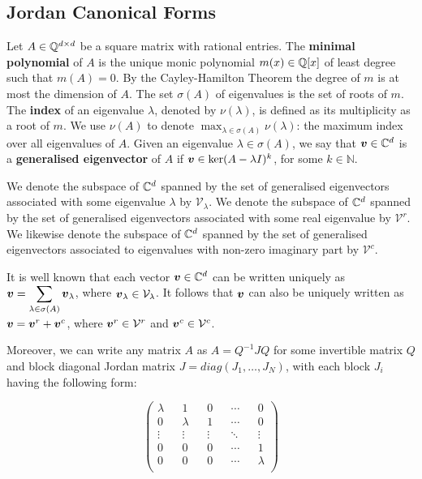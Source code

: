 \subsection{Jordan Canonical Forms}

Let $A \in \mathbb{Q}^{d \times d}$ be a square matrix with rational
entries.  The \textbf{minimal polynomial} of $A$ is the unique monic
polynomial $m(x) \in \mathbb{Q}[x]$ of least degree such that
$m(A)=0$.  By the Cayley-Hamilton Theorem the degree of $m$ is at most
the dimension of $A$. The set $\sigma(A)$ of eigenvalues is the set of
roots of $m$.  The \textbf{index} of an eigenvalue $\lambda$, denoted
by $\nu(\lambda)$, is defined as its multiplicity as a root of $m$. We
use $\nu(A)$ to denote $\max_{\lambda\in\sigma(A)} \nu(\lambda)$: the
maximum index over all eigenvalues of $A$.  Given an eigenvalue
$\lambda \in \sigma(A)$, we say that $\boldsymbol{v} \in \mathbb{C}^d$
is a \textbf{generalised eigenvector} of $A$ if
$\boldsymbol{v}\in \ker(A-\lambda I)^{k}$, for some $k\in\mathbb{N}$.

We denote the subspace of $\mathbb{C}^d$ spanned by the set of
generalised eigenvectors associated with some eigenvalue $\lambda$ by
$\mathcal{V}_{\lambda}$. We denote the subspace of $\mathbb{C}^d$
spanned by the set of generalised eigenvectors associated with some
real eigenvalue by $\mathcal{V}^{r}$.  We likewise denote the subspace
of $\mathbb{C}^d$ spanned by the set of generalised eigenvectors
associated to eigenvalues with non-zero imaginary part by
$\mathcal{V}^{c}$.

It is well known that each vector $\boldsymbol{v}\in\mathbb{C}^{d}$
can be written uniquely as
$\boldsymbol{v}=\displaystyle{
  \sum\limits_{\lambda\in\sigma(A)}\boldsymbol{v}_{\lambda}}$,
where $\boldsymbol{v}_{\lambda}\in\mathcal{V}_{\lambda}$.
It follows that $\boldsymbol{v}$ can also be uniquely written as
$\boldsymbol{v}=\boldsymbol{v}^{r}+\boldsymbol{v}^{c}$, where
$\boldsymbol{v}^{r} \in\mathcal{V}^{r}$ and
$\boldsymbol{v}^{c} \in\mathcal{V}^{c}$.

Moreover, we can write any matrix $A$ as $A=Q^{-1}JQ$ for some
invertible matrix $Q$ and block diagonal Jordan matrix
$J=diag(J_{1},\ldots,J_{N})$, with each block $J_{i}$ having the
following form:

\begin{equation*}
\begin{pmatrix}
\lambda	&&	1		&&	0		&&	\cdots	&&	0		\\
0		&&	\lambda	&&	1		&&	\cdots	&&	0		\\
\vdots	&&	\vdots	&&	\vdots	&&	\ddots	&&	\vdots	\\
0		&&	0		&&	0		&&	\cdots	&&	1		\\
0		&&	0		&&	0		&&	\cdots	&&	\lambda	\\
\end{pmatrix}
\end{equation*}

